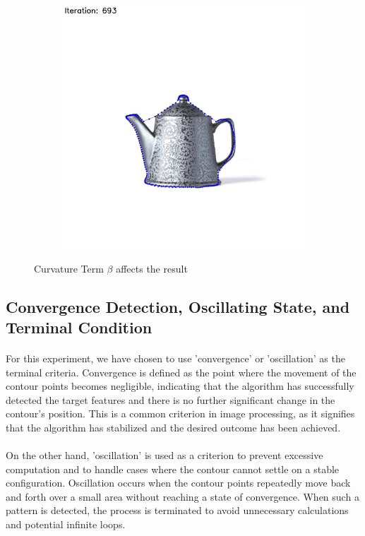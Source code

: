 \documentclass[12pt,a4paper]{report}
\begin{document}
\begin{figure}[!]
\begin{minipage}{\linewidth}
\begin{subfigure}{0.49\textwidth}
              \includegraphics[width=\linewidth]{result_img/beta_0_00001.jpg}
        \end{subfigure}

        \caption{Curvature Term \(\beta\) affects the result}
    \end{minipage}

\end{figure}


\subsection{Convergence Detection, Oscillating State, and Terminal Condition}
\paragraph*{}
For this experiment, we have chosen to use 'convergence' or 'oscillation' as the terminal criteria. Convergence is defined as the point where the movement of the contour points becomes negligible, indicating that the algorithm has successfully detected the target features and there is no further significant change in the contour's position. This is a common criterion in image processing, as it signifies that the algorithm has stabilized and the desired outcome has been achieved.
\paragraph*{}
On the other hand, 'oscillation' is used as a criterion to prevent excessive computation and to handle cases where the contour cannot settle on a stable configuration. Oscillation occurs when the contour points repeatedly move back and forth over a small area without reaching a state of convergence. When such a pattern is detected, the process is terminated to avoid unnecessary calculations and potential infinite loops.
\end{document}
